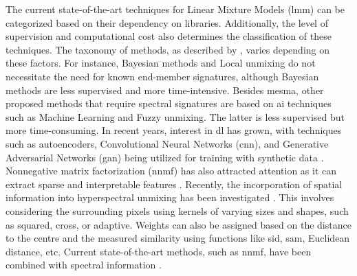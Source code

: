 The current state-of-the-art techniques for Linear Mixture Models (\acrshort{lmm}) can be categorized based on their dependency on libraries. Additionally, the level of supervision and computational cost also determines the classification of these techniques. The taxonomy of methods, as described by \cite{borsoi_spectral_2021}, varies depending on these factors. For instance, Bayesian methods and Local unmixing do not necessitate the need for known end-member signatures, although Bayesian methods are less supervised and more time-intensive. Besides \acrshort{mesma}, other proposed methods that require spectral signatures are based on \acrshort{ai} techniques such as Machine Learning and Fuzzy unmixing. The latter is less supervised but more time-consuming. In recent years, interest in \acrshort{dl} has grown, with techniques such as autoencoders, Convolutional Neural Networks (\acrshort{cnn}), and Generative Adversarial Networks (\acrshort{gan}) being utilized for training with synthetic data \cite{bhatt_deep_2020}. Nonnegative matrix factorization (\acrshort{nnmf}) has also attracted attention as it can extract sparse and interpretable features \cite{hruska_machine_2018}. Recently, the incorporation of spatial information into hyperspectral unmixing has been investigated \cite{shi_incorporating_2014}. This involves considering the surrounding pixels using kernels of varying sizes and shapes, such as squared, cross, or adaptive. Weights can also be assigned based on the distance to the centre and the measured similarity using functions like \acrshort{sid}, \acrshort{sam}, Euclidean distance, etc. Current state-of-the-art methods, such as \acrshort{nnmf}, have been combined with spectral information \cite{zhang_spectral-spatial_2022}.

